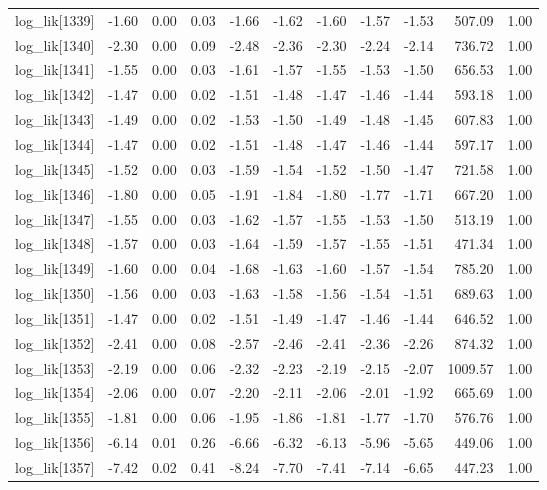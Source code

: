 \begin{table}[ht]
\begin{tabular}{rrrrrrrrrrr}
  log\_lik[1339] & -1.60 & 0.00 & 0.03 & -1.66 & -1.62 & -1.60 & -1.57 & -1.53 & 507.09 & 1.00 \\ 
  log\_lik[1340] & -2.30 & 0.00 & 0.09 & -2.48 & -2.36 & -2.30 & -2.24 & -2.14 & 736.72 & 1.00 \\ 
  log\_lik[1341] & -1.55 & 0.00 & 0.03 & -1.61 & -1.57 & -1.55 & -1.53 & -1.50 & 656.53 & 1.00 \\ 
  log\_lik[1342] & -1.47 & 0.00 & 0.02 & -1.51 & -1.48 & -1.47 & -1.46 & -1.44 & 593.18 & 1.00 \\ 
  log\_lik[1343] & -1.49 & 0.00 & 0.02 & -1.53 & -1.50 & -1.49 & -1.48 & -1.45 & 607.83 & 1.00 \\ 
  log\_lik[1344] & -1.47 & 0.00 & 0.02 & -1.51 & -1.48 & -1.47 & -1.46 & -1.44 & 597.17 & 1.00 \\ 
  log\_lik[1345] & -1.52 & 0.00 & 0.03 & -1.59 & -1.54 & -1.52 & -1.50 & -1.47 & 721.58 & 1.00 \\ 
  log\_lik[1346] & -1.80 & 0.00 & 0.05 & -1.91 & -1.84 & -1.80 & -1.77 & -1.71 & 667.20 & 1.00 \\ 
  log\_lik[1347] & -1.55 & 0.00 & 0.03 & -1.62 & -1.57 & -1.55 & -1.53 & -1.50 & 513.19 & 1.00 \\ 
  log\_lik[1348] & -1.57 & 0.00 & 0.03 & -1.64 & -1.59 & -1.57 & -1.55 & -1.51 & 471.34 & 1.00 \\ 
  log\_lik[1349] & -1.60 & 0.00 & 0.04 & -1.68 & -1.63 & -1.60 & -1.57 & -1.54 & 785.20 & 1.00 \\ 
  log\_lik[1350] & -1.56 & 0.00 & 0.03 & -1.63 & -1.58 & -1.56 & -1.54 & -1.51 & 689.63 & 1.00 \\ 
  log\_lik[1351] & -1.47 & 0.00 & 0.02 & -1.51 & -1.49 & -1.47 & -1.46 & -1.44 & 646.52 & 1.00 \\ 
  log\_lik[1352] & -2.41 & 0.00 & 0.08 & -2.57 & -2.46 & -2.41 & -2.36 & -2.26 & 874.32 & 1.00 \\ 
  log\_lik[1353] & -2.19 & 0.00 & 0.06 & -2.32 & -2.23 & -2.19 & -2.15 & -2.07 & 1009.57 & 1.00 \\ 
  log\_lik[1354] & -2.06 & 0.00 & 0.07 & -2.20 & -2.11 & -2.06 & -2.01 & -1.92 & 665.69 & 1.00 \\ 
  log\_lik[1355] & -1.81 & 0.00 & 0.06 & -1.95 & -1.86 & -1.81 & -1.77 & -1.70 & 576.76 & 1.00 \\ 
  log\_lik[1356] & -6.14 & 0.01 & 0.26 & -6.66 & -6.32 & -6.13 & -5.96 & -5.65 & 449.06 & 1.00 \\ 
  log\_lik[1357] & -7.42 & 0.02 & 0.41 & -8.24 & -7.70 & -7.41 & -7.14 & -6.65 & 447.23 & 1.00 \\ 

\end{tabular}
\end{table}
